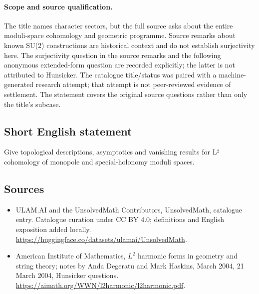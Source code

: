 \documentclass[11pt]{article}
\begin{document}
\paragraph{Scope and source qualification.}The title names character sectors, but the full source asks about the entire moduli-space cohomology and geometric programme. Source remarks about known SU(2) constructions are historical context and do not establish surjectivity here. The surjectivity question in the source remarks and the following anonymous extended-form question are recorded explicitly; the latter is not attributed to Hunsicker. The catalogue title/status was paired with a machine-generated research attempt; that attempt is not peer-reviewed evidence of settlement. The statement covers the original source questions rather than only the title’s subcase.
\subsection{Short English statement}
Give topological descriptions, asymptotics and vanishing results for L² cohomology of monopole and special-holonomy moduli spaces.
\subsection{Sources}
\begin{itemize}
\item[\hypertarget{source:statement:1}{S1}] ULAM.AI and the UnsolvedMath Contributors, UnsolvedMath, catalogue entry. Catalogue curation under CC BY 4.0; definitions and English exposition added locally.
\url{https://huggingface.co/datasets/ulamai/UnsolvedMath}.
\item[\hypertarget{source:statement:2}{S2}] American Institute of Mathematics, $L^2$ harmonic forms in geometry and string theory; notes by Anda Degeratu and Mark Haskins, March 2004, 21 March 2004, Hunsicker questions.
\url{https://aimath.org/WWN/l2harmonic/l2harmonic.pdf}.
\end{itemize}
\label{end:statement}
\end{document}
